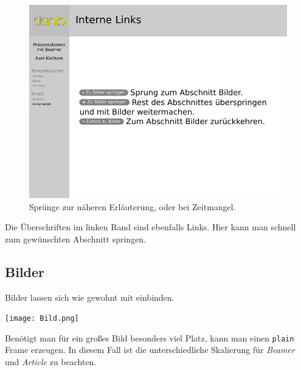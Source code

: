 \begin{figure}
  \includegraphics[width=\textwidth]{beamer-sprung}
  \caption{Sprünge zur näheren Erläuterung, oder bei Zeitmangel.}
  \label{fig:sprung}
\end{figure}

Die Überschriften im linken Rand sind ebenfalls Links.
Hier kann man schnell zum gewünschten Abschnitt springen.

\subsection{Bilder}

Bilder lassen sich wie gewohnt mit  einbinden.

\begin{lfgwcode}{}
\texttt{[image: Bild.png]}
\end{lfgwcode}

Benötigt man für ein großes Bild besonders viel Platz, kann man einen
\texttt{plain} Frame erzeugen. In diesem Fall ist die unterschiedliche
Skalierung für \textit{Beamer} und \textit{Article} zu beachten.

\begin{lfgwcode}{}
\begin{frame}[plain]
  \begin{centering}%
    \par%
  \end{centering}%
\end{frame}
\end{lfgwcode}


